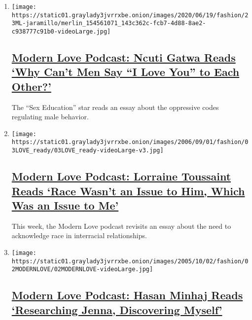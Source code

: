 \begin{enumerate}
\def\labelenumi{\arabic{enumi}.}
\item
  \texttt{[image: https://static01.graylady3jvrrxbe.onion/images/2020/06/19/fashion/23ML-jaramillo/merlin\_154561071\_143c362c-fcb7-4d88-8ae2-c938777c91b0-videoLarge.jpg]}

  \hypertarget{modern-love-podcast-ncuti-gatwa-reads-why-cant-men-say-i-love-you-to-each-other}{%
  \subsection{\texorpdfstring{\href{/2020/06/17/style/modern-love-podcast-ncuti-gatwa.html}{Modern
  Love Podcast: Ncuti Gatwa Reads `Why Can't Men Say ``I Love You'' to
  Each
  Other?'}}{Modern Love Podcast: Ncuti Gatwa Reads `Why Can't Men Say ``I Love You'' to Each Other?'}}\label{modern-love-podcast-ncuti-gatwa-reads-why-cant-men-say-i-love-you-to-each-other}}

  The ``Sex Education'' star reads an essay about the oppressive codes
  regulating male behavior.
\item
  \texttt{[image: https://static01.graylady3jvrrxbe.onion/images/2006/09/01/fashion/03LOVE\_ready/03LOVE\_ready-videoLarge-v3.jpg]}

  \hypertarget{modern-love-podcast-lorraine-toussaint-reads-race-wasnt-an-issue-to-him-which-was-an-issue-to-me}{%
  \subsection{\texorpdfstring{\href{/2020/06/10/style/modern-love-podcast-lorraine-toussant-updated-poscript.html}{Modern
  Love Podcast: Lorraine Toussaint Reads `Race Wasn't an Issue to Him,
  Which Was an Issue to
  Me'}}{Modern Love Podcast: Lorraine Toussaint Reads `Race Wasn't an Issue to Him, Which Was an Issue to Me'}}\label{modern-love-podcast-lorraine-toussaint-reads-race-wasnt-an-issue-to-him-which-was-an-issue-to-me}}

  This week, the Modern Love podcast revisits an essay about the need to
  acknowledge race in interracial relationships.
\item
  \texttt{[image: https://static01.graylady3jvrrxbe.onion/images/2005/10/02/fashion/02MODERNLOVE/02MODERNLOVE-videoLarge.jpg]}

  \hypertarget{modern-love-podcast-hasan-minhaj-reads-researching-jenna-discovering-myself}{%
  \subsection{\texorpdfstring{\href{/2020/06/03/style/modern-love-podcast-hasan-minhaj.html}{Modern
  Love Podcast: Hasan Minhaj Reads `Researching Jenna, Discovering
  Myself'}}{Modern Love Podcast: Hasan Minhaj Reads `Researching Jenna, Discovering Myself'}}\label{modern-love-podcast-hasan-minhaj-reads-researching-jenna-discovering-myself}}


\end{enumerate}
